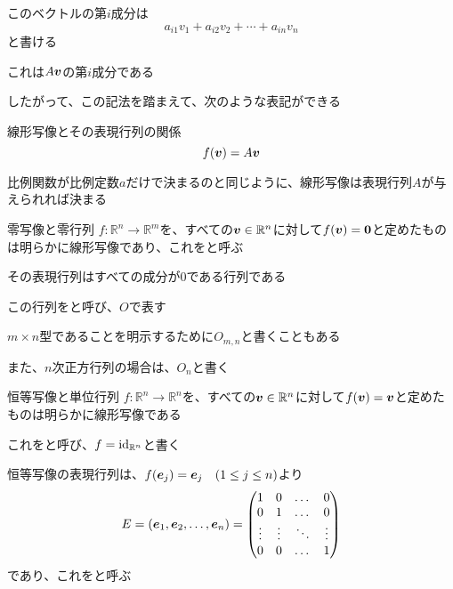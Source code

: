 \documentclass[../../../topic_linear-algebra]{subfiles}
\begin{document}
このベクトルの第$i$成分は
\begin{equation*}
  a_{i1} v_1 + a_{i2} v_2 + \cdots + a_{in} v_n
\end{equation*}
と書ける

これは$A\vb*{v}$の第$i$成分である

\br

したがって、この記法を踏まえて、次のような表記ができる

\begin{theorem}{線形写像とその表現行列の関係}
  \begin{equation*}
    f(\vb*{v}) = A\vb*{v}
  \end{equation*}
\end{theorem}

比例関数が比例定数$a$だけで決まるのと同じように、線形写像は表現行列$A$が与えられれば決まる

\sectionline

\begin{definition}{零写像と零行列}
  $f\colon \mathbb{R}^n \to \mathbb{R}^m$を、すべての$\vb*{v} \in \mathbb{R}^n$に対して$f(\vb*{v}) = \vb*{0}$と定めたものは明らかに線形写像であり、これをと呼ぶ

  その表現行列はすべての成分が0である行列である

  この行列をと呼び、$O$で表す
\end{definition}

$m \times n$型であることを明示するために$O_{m,n}$と書くこともある

また、$n$次正方行列の場合は、$O_n$と書く

\sectionline

\begin{definition}{恒等写像と単位行列}
  $f\colon \mathbb{R}^n \to \mathbb{R}^n$を、すべての$\vb*{v} \in \mathbb{R}^n$に対して$f(\vb*{v}) = \vb*{v}$と定めたものは明らかに線形写像である

  これをと呼び、$f = \operatorname{id}_{\mathbb{R}^n}$と書く

  恒等写像の表現行列は、$f(\vb*{e}_j) = \vb*{e}_j \quad (1 \leq j \leq n)$より
  \begin{equation*}
    E = (\vb*{e}_1, \vb*{e}_2, \dots, \vb*{e}_n) = \begin{pmatrix}
      1      & 0      & \dots  & 0      \\
      0      & 1      & \dots  & 0      \\
      \vdots & \vdots & \ddots & \vdots \\
      0      & 0      & \dots  & 1
    \end{pmatrix}
  \end{equation*}
  であり、これをと呼ぶ
\end{definition}
\end{document}
